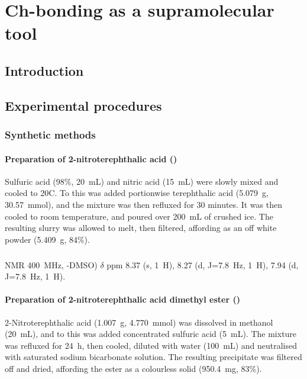 \chapter{Ch-bonding as a supramolecular tool}
\section{Introduction}


\section{Experimental procedures}

\subsection{Synthetic methods}
\subsubsection{Preparation of 2-nitroterephthalic acid ()}
Sulfuric acid (98\%, 20~mL) and nitric acid (15~mL) were slowly mixed and cooled to 20\degree C. 
To this was added portionwise terephthalic acid (5.079~g, 30.57~mmol), and the mixture was then refluxed for 30 minutes. 
It was then cooled to room temperature, and poured over 200~mL of crushed ice. 
The resulting slurry was allowed to melt, then filtered, affording  as an off white powder (5.409~g, 84\%).

\footnotesize\paragraph{}

 NMR 400~MHz, -DMSO) $\delta$ ppm 
8.37 (s, 1~H), 8.27 (d, J=7.8~Hz, 1~H), 7.94 (d, J=7.8~Hz, 1~H).

\normalsize

\subsubsection{Preparation of 2-nitroterephthalic acid dimethyl ester ()}
2-Nitroterephthalic acid (1.007~g, 4.770~mmol) was dissolved in methanol (20~mL), and to this was added concentrated sulfuric acid (5~mL). The mixture was refluxed for 24~h, then cooled, diluted with water (100~mL) and neutralised with saturated sodium bicarbonate solution. The resulting precipitate was filtered off and dried, affording the ester  as a colourless solid (950.4~mg, 83\%).


